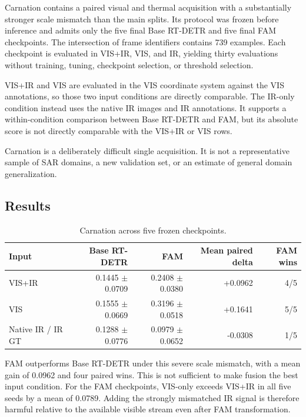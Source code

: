 Carnation contains a paired visual and thermal acquisition with a substantially
stronger scale mismatch than the main splits. Its protocol was frozen before
inference and admits only the five final Base RT-DETR and five final FAM
checkpoints. The intersection of frame identifiers contains 739 examples.
Each checkpoint is evaluated in VIS+IR, VIS, and IR, yielding thirty
evaluations without training, tuning, checkpoint selection, or threshold
selection.

VIS+IR and VIS are evaluated in the VIS coordinate system against the VIS
annotations, so those two input conditions are directly comparable. The
IR-only condition instead uses the native IR images and IR annotations. It
supports a within-condition comparison between Base RT-DETR and FAM, but its
absolute score is not directly comparable with the VIS+IR or VIS rows.

Carnation is a deliberately difficult single acquisition. It is not a
representative sample of SAR domains, a new validation set, or an estimate of
general domain generalization.

\subsection{Results}

\begin{table}[htbp]
  \centering
  \caption{Carnation \mapfifty{} across five frozen checkpoints.}
  \label{tab:carnation-results}
  \begin{tabular}{lrrrr}
    \toprule
    Input & Base RT-DETR & FAM & Mean paired delta & FAM wins \\
    \midrule
    VIS+IR & 0.1445 \(\pm\) 0.0709 & 0.2408 \(\pm\) 0.0380 & +0.0962 & 4/5 \\
    VIS & 0.1555 \(\pm\) 0.0669 & 0.3196 \(\pm\) 0.0518 & +0.1641 & 5/5 \\
    Native IR / IR GT & 0.1288 \(\pm\) 0.0776 & 0.0979 \(\pm\) 0.0652 & -0.0308 & 1/5 \\
    \bottomrule
  \end{tabular}
\end{table}

FAM outperforms Base RT-DETR under this severe scale mismatch, with a mean gain
of 0.0962 and four paired wins. This is not sufficient to make fusion the best
input condition. For the FAM checkpoints, VIS-only exceeds VIS+IR in all five
seeds by a mean of 0.0789. Adding the strongly mismatched IR signal is therefore
harmful relative to the available visible stream even after FAM transformation.

